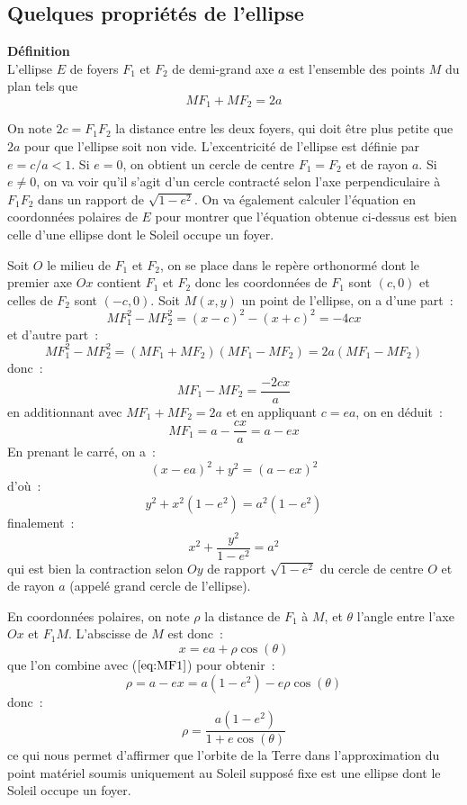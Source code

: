\documentclass[a4paper,11pt]{book}
\begin{document}
\begin{giacjshere}
\section{Quelques propriétés de l'ellipse}
{\bf D\'efinition}\\
L'ellipse $E$ de foyers $F_1$ et $F_2$ de demi-grand axe
$a$ est l'ensemble des points $M$ du plan tels que 
\[ MF_1+MF_2=2a\]

On note $2c=F_1F_2$ la distance entre les deux foyers, qui doit \^etre
plus petite que $2a$ pour que l'ellipse soit non vide.
L'excentricit\'e de l'ellipse est d\'efinie par $e=c/a < 1$. Si $e=0$,
on obtient un cercle de centre $F_1=F_2$ et de rayon $a$. Si $e\neq 0$,
on va voir qu'il s'agit d'un cercle contracté
selon l'axe perpendiculaire \`a $F_1F_2$ dans un rapport de 
$\sqrt{1-e^2}$. On va \'egalement calculer l'\'equation en
coordonn\'ees polaires de $E$ pour montrer que l'\'equation obtenue
ci-dessus est bien celle d'une ellipse dont le Soleil occupe un foyer.

Soit $O$ le milieu de $F_1$ et $F_2$, on se place dans le rep\`ere orthonorm\'e
dont le premier axe $Ox$ contient $F_1$ et $F_2$ donc les
coordonn\'ees de $F_1$ sont $(c,0)$ et celles de $F_2$ sont $(-c,0)$. 
Soit $M(x,y)$ un
point de l'ellipse, on a d'une part~:
\[ MF_1^2 - MF_2^2 = (x-c)^2-(x+c)^2 = -4cx \]
et d'autre part~:
\[ MF_1^2 - MF_2^2 = (MF_1 + MF_2)(MF_1 - MF_2 ) = 2a (MF_1 - MF_2 )\]
donc~:
\[ MF_1 - MF_2 = \frac{-2cx}{a} \]
en additionnant avec $MF_1+MF_2=2a$ et en appliquant $c=ea$, on en d\'eduit~:
\begin{equation} \label{eq:MF1bis}
 MF_1 = a - \frac{cx}{a} = a-ex 
\end{equation}
En prenant le carr\'e, on a~:
\[ (x-ea)^2 + y^2 = (a-ex)^2\]
d'o\`u~:
\[ y^2 + x^2 (1-e^2) = a^2(1-e^2) \]
finalement~:
\[ x^2 + \frac{y^2}{1-e^2} = a^2 \]
qui est bien la contraction selon $Oy$ de rapport $\sqrt{1-e^2}$ du
cercle de centre $O$ et de rayon $a$ (appel\'e grand cercle de
l'ellipse).

En coordonn\'ees polaires, on note $\rho$ la distance de $F_1$ \`a
$M$, et $\theta$ l'angle entre l'axe $Ox$ et $F_1M$. L'abscisse de $M$
est donc~:
\[ x= ea + \rho \cos(\theta)\]
que l'on combine avec (\(\ref{eq:MF1}\)) pour obtenir~:
\[ \rho = a-ex =a(1-e^2) - e \rho \cos(\theta) \]
donc~:
\[ \rho = \frac{a(1-e^2)}{1+e\cos(\theta)} \]
ce qui nous permet d'affirmer que l'orbite de la Terre dans
l'approximation du point mat\'eriel soumis uniquement au Soleil
suppos\'e fixe est une ellipse dont le Soleil occupe un foyer.


\end{giacjshere}
\end{document}
